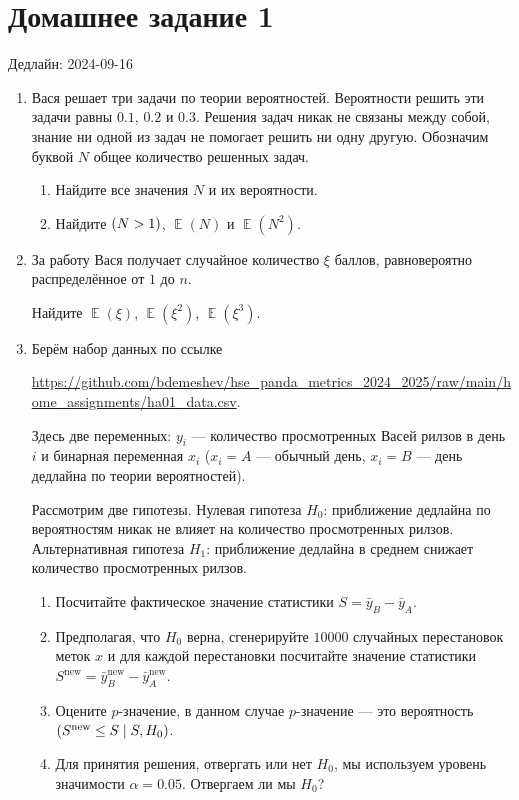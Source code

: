 \documentclass[12pt]{article}
\let\P\relax
\DeclareMathOperator{\P}{\mathbb{P}}
\DeclareMathOperator{\E}{\mathbb{E}}
\begin{document}
\section*{Домашнее задание 1}

Дедлайн: 2024-09-16

\begin{enumerate}
\item Вася решает три задачи по теории вероятностей. 
Вероятности решить эти задачи равны $0.1$, $0.2$ и $0.3$. 
Решения задач никак не связаны между собой, знание ни одной из задач не помогает решить ни одну другую.
Обозначим буквой $N$ общее количество решенных задач. 

\begin{enumerate}
    \item Найдите все значения $N$ и их вероятности. 
    \item Найдите $\P(N > 1)$, $\E(N)$ и $\E(N^2)$.
\end{enumerate}

\item За работу Вася получает случайное количество $\xi$ баллов, равновероятно распределённое от $1$ до $n$. 

Найдите $\E(\xi)$, $\E(\xi^2)$, $\E(\xi^3)$.

\item Берём набор данных по ссылке 

\url{https://github.com/bdemeshev/hse_panda_metrics_2024_2025/raw/main/home_assignments/ha01_data.csv}.

Здесь две переменных: $y_i$ — количество просмотренных Васей рилзов в день $i$ 
и бинарная переменная $x_i$ ($x_i = A$ — обычный день, $x_i = B$ — день дедлайна по теории вероятностей).

Рассмотрим две гипотезы. 
Нулевая гипотеза $H_0$: приближение дедлайна по вероятностям никак не влияет на количество просмотренных рилзов.
Альтернативная гипотеза $H_1$: приближение дедлайна в среднем снижает количество просмотренных рилзов. 

\begin{enumerate}
    \item Посчитайте фактическое значение статистики $S = \bar y_B - \bar y_A$.
    \item Предполагая, что $H_0$ верна, сгенерируйте $10000$ случайных перестановок меток $x$ и для 
    каждой перестановки посчитайте значение статистики $S^{\text{new}} = \bar y_B^{\text{new}} - \bar y_A^{\text{new}}$.
    \item Оцените $p$-значение, в данном случае $p$-значение — это вероятность $\P(S^{\text{new}} \leq S \mid S, H_0)$.
    \item Для принятия решения, отвергать или нет $H_0$, мы используем уровень значимости $\alpha = 0.05$.
    Отвергаем ли мы $H_0$?
\end{enumerate}

\end{enumerate}
\end{document}
